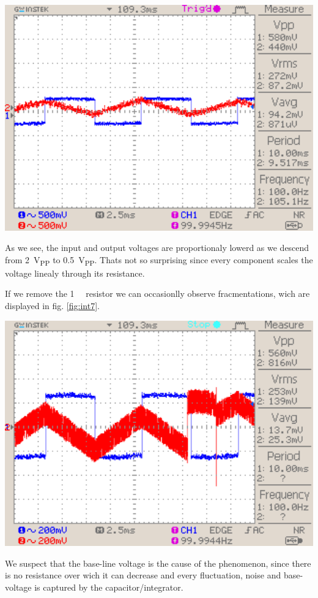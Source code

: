 \documentclass[a4paper,10pt]{article}
\newenvironment{Figure}
        {\par\medskip\noindent\minipage{\linewidth}}
        {\endminipage\par\medskip}
\numberwithin{equation}{section}
\begin{document}
\begin{multicols}{2}
\begin{Figure}
		\includegraphics[width=1\textwidth]{../data/DS0037_n.png}
		\label{fig:int6}
	\end{Figure}
	As we see, the input and output voltages are proportionaly lowerd as we descend from \SI{2}{V_{PP}} to \SI{0.5}{V_{PP}}. Thats not so surprising since every component scales the voltage linealy through its resistance.

	If we remove the \SI{1}{\mega \Omega} resistor we can occasionlly observe fracmentations, wich are displayed in fig. \ref{fig:int7}.
	\begin{Figure}
		\centering
		\includegraphics[width=1\textwidth]{../data/DS0038_n.png}
		\label{fig:int7}
	\end{Figure}
	We suspect that the base-line voltage is the cause of the phenomenon, since there is no resistance over wich it can decrease and every fluctuation, noise and base-voltage is captured by the capacitor/integrator.


\end{multicols}
\end{document}
